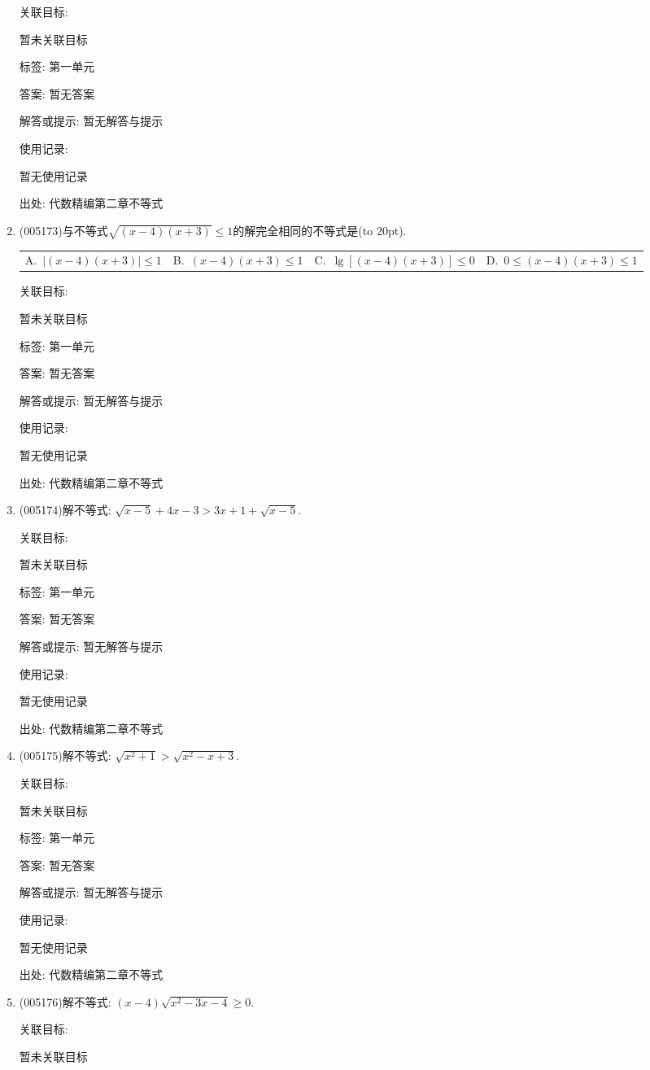 \documentclass[10pt,a4paper]{article}
\newcommand{\bracket}[1]{(\hbox to #1pt{})}
\newcommand{\fourch}[4]{\par\begin{tabular}{p{.23\textwidth}p{.23\textwidth}p{.23\textwidth}p{.23\textwidth}}
A.~#1 &B.~#2& C.~#3& D.~#4
\end{tabular}}
\begin{document}
\begin{enumerate}[1.]
关联目标:

暂未关联目标



标签: 第一单元

答案: 暂无答案

解答或提示: 暂无解答与提示

使用记录:

暂无使用记录


出处: 代数精编第二章不等式
\item { (005173)}与不等式$\sqrt{(x-4)(x+3)}\le 1$的解完全相同的不等式是\bracket{20}.
\fourch{$|(x-4)(x+3)|\le 1$}{$(x-4)(x+3)\le 1$}{$\lg [ (x-4)(x+3) ]\le 0$}{$0\le (x-4)(x+3)\le 1$}


关联目标:

暂未关联目标



标签: 第一单元

答案: 暂无答案

解答或提示: 暂无解答与提示

使用记录:

暂无使用记录


出处: 代数精编第二章不等式
\item { (005174)}解不等式: $\sqrt{x-5}+4x-3>3x+1+\sqrt{x-5}$.


关联目标:

暂未关联目标



标签: 第一单元

答案: 暂无答案

解答或提示: 暂无解答与提示

使用记录:

暂无使用记录


出处: 代数精编第二章不等式
\item { (005175)}解不等式: $\sqrt{x^2+1}>\sqrt{x^2-x+3}$.


关联目标:

暂未关联目标



标签: 第一单元

答案: 暂无答案

解答或提示: 暂无解答与提示

使用记录:

暂无使用记录


出处: 代数精编第二章不等式
\item { (005176)}解不等式: $(x-4)\sqrt{x^2-3x-4}\ge 0$.


关联目标:

暂未关联目标




\end{enumerate}
\end{document}
